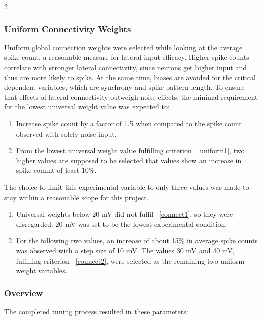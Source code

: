 \documentclass[12pt,a4paper]{article}
\begin{document}
\begin{multicols}{2}
        \subsubsection{Uniform Connectivity Weights}
            Uniform global connection weights were selected while looking at the average spike count, a reasonable measure for lateral input efficacy. Higher spike counts correlate with stronger lateral connectivity, since neurons get higher input and thus are more likely to spike. At the same time, biases are avoided for the critical dependent variables, which are synchrony and spike pattern length. To ensure that effects of lateral connectivity outweigh noise effects, the minimal requirement for the lowest universal weight value was expected to: 
            \begin{enumerate}[label=(\arabic*), leftmargin=*, rightmargin=1em, itemsep=10pt, parsep=0pt, topsep=10pt, partopsep=0pt]
                \item\label{uniform1} Increase spike count by a factor of 1.5 when compared to the spike count observed with solely noise input.
                \item\label{uniform2} From the lowest universal weight value fulfilling criterion ~\ref{uniform1}, two higher values are supposed to be selected that values show an increase in spike counnt of least 10\%.
            \end{enumerate}
            The choice to limit this experimental variable to only three values was made to stay within a reasonable scope for this project.
            
            \begin{enumerate}[label=\alph*), labelwidth=1.5em, labelsep=1.5pt, leftmargin=1em, itemindent=0pt, rightmargin=0pt, itemsep=5pt, parsep=0pt, topsep=2pt, partopsep=0pt]
                \item\label{weights1} Universal weights below 20 mV did not fulfil ~\ref{connect1}, so they were disregarded. 20 mV was set to be the lowest experimental condition.
                \item\label{weights2} For the following two values, an increase of about 15\% in average spike counts was observed with a step size of 10 mV. The values 30 mV and 40 mV, fulfilling criterion ~\ref{connect2}, were selected as the remaining two uniform weight variables.
            \end{enumerate}
            
        \subsubsection{Overview}
            The completed tuning process resulted in these parameters:


\end{multicols}
\end{document}
